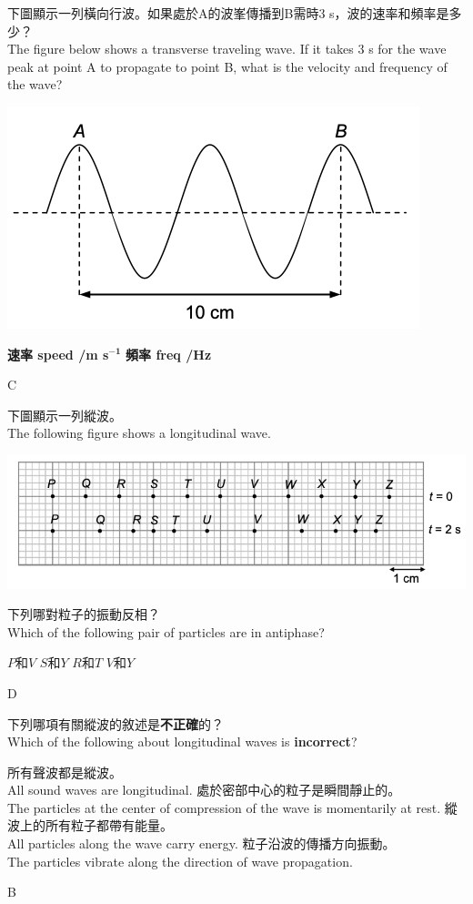 {
    下圖顯示一列橫向行波。如果處於A的波峯傳播到B需時3 s，波的速率和頻率是多少？\\The figure below shows a transverse traveling wave. If it takes 3 s for the wave peak at point A to propagate to point B, what is the velocity and frequency of the wave?
    \par{\par\centering\includegraphics[width=.4\textwidth]{./img/ch1_earlyclass_wave_mc_2024-05-13-16-05-45.png}\par}
    \begin{tasks}
        \task [] \textbf{速率 speed /m s}$\mathbf{^{-1}}$ \tab \textbf{頻率 freq /Hz}
         \tab{}
         \tab{}
         \tab{}
         \tab{}
    \end{tasks}

}{C}


{
    下圖顯示一列縱波。\\The following figure shows a longitudinal wave.
    \par{\par\centering\includegraphics[width=.6\textwidth]{./img/ch1_earlyclass_wave_mc_2024-05-13-16-15-20.png}\par}
    下列哪對粒子的振動反相？\\Which of the following pair of particles are in antiphase?
    \begin{tasks}
        \task $P$和$V$
        \task $S$和$Y$
        \task $R$和$T$
        \task $V$和$Y$
    \end{tasks}

}{D}

{
    下列哪項有關縱波的敘述是\textbf{不正確}的？\\Which of the following about longitudinal waves is \textbf{incorrect}?
    \begin{tasks}
        \task 所有聲波都是縱波。\\All sound waves are longitudinal.
        \task 處於密部中心的粒子是瞬間靜止的。\\The particles at the center of compression of the wave is momentarily at rest.
        \task 縱波上的所有粒子都帶有能量。\\All particles along the wave carry energy.
        \task 粒子沿波的傳播方向振動。\\The particles vibrate along the direction of wave propagation.
    \end{tasks}

}{B}

